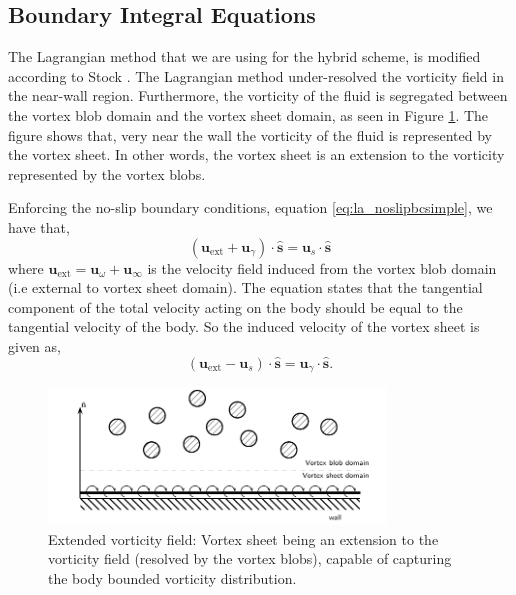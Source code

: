 \subsection{Boundary Integral Equations}

The Lagrangian method that we are using for the hybrid scheme, is modified according to Stock \cite{Stock2010a}. The Lagrangian method under-resolved the vorticity field in the near-wall region. Furthermore, the vorticity of the fluid is segregated between the vortex blob domain and the vortex sheet domain, as seen in Figure \ref{fig:extendedVorticityField}. The figure shows that, very near the wall the vorticity of the fluid is represented by the vortex sheet. In other words, the vortex sheet is an extension to the vorticity represented by the vortex blobs. %

Enforcing the no-slip boundary conditions, equation \ref{eq:la_noslipbcsimple}, we have that,
	\begin{equation}
	\left(\mathbf{u}_{\mathrm{ext}} + \mathbf{u}_{\gamma}\right)\cdot\mathbf{\hat{s}} = \mathbf{u}_s \cdot \mathbf{\hat{s}}
	\label{eq:kinematicBCofVSOutside}
	\end{equation}
where $\mathbf{u}_{\mathrm{ext}} = \mathbf{u}_{\omega} + \mathbf{u}_{\infty}$ is the velocity field induced from the vortex blob domain (i.e external to vortex sheet domain). The equation states that the tangential component of the total velocity acting on the body should be equal to the tangential velocity of the body. So the induced velocity of the vortex sheet is given as,
	\begin{equation}
	\left(\mathbf{u}_{\mathrm{ext}} - \mathbf{u}_s\right) \cdot \mathbf{\hat{s}} = \mathbf{u}_{\gamma}\cdot\mathbf{\hat{s}}.
	\label{eq:kinematicBCofVS}
	\end{equation}

	\begin{figure}[t]
	\centering
	\includegraphics[width=0.8\textwidth]{figures/lagrangian/extendedVorticityField.pdf}
	\caption{Extended vorticity field: Vortex sheet being an extension to the vorticity field (resolved by the vortex blobs), capable of capturing the body bounded vorticity distribution.}
	\label{fig:extendedVorticityField}
	\end{figure}	

